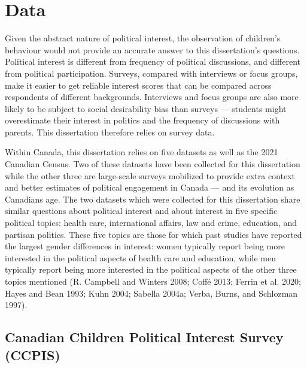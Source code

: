 \documentclass[
  letterpaper,
  DIV=11,
  numbers=noendperiod]{scrreprt}
\begin{document}
\hypertarget{data}{%
\section{Data}\label{data}}

Given the abstract nature of political interest, the observation of
children's behaviour would not provide an accurate answer to this
dissertation's questions. Political interest is different from frequency
of political discussions, and different from political participation.
Surveys, compared with interviews or focus groups, make it easier to get
reliable interest scores that can be compared across respondents of
different backgrounds. Interviews and focus groups are also more likely
to be subject to social desirability bias than surveys --- students
might overestimate their interest in politics and the frequency of
discussions with parents. This dissertation therefore relies on survey
data.

Within Canada, this dissertation relies on five datasets as well as the
2021 Canadian Census. Two of these datasets have been collected for this
dissertation while the other three are large-scale surveys mobilized to
provide extra context and better estimates of political engagement in
Canada --- and its evolution as Canadians age. The two datasets which
were collected for this dissertation share similar questions about
political interest and about interest in five specific political topics:
health care, international affairs, law and crime, education, and
partisan politics. These five topics are those for which past studies
have reported the largest gender differences in interest: women
typically report being more interested in the political aspects of
health care and education, while men typically report being more
interested in the political aspects of the other three topics mentioned
(R. Campbell and Winters 2008; Coffé 2013; Ferrin et al. 2020; Hayes and
Bean 1993; Kuhn 2004; Sabella 2004a; Verba, Burns, and Schlozman 1997).

\hypertarget{canadian-children-political-interest-survey-ccpis}{%
\subsection{Canadian Children Political Interest Survey
(CCPIS)}\label{canadian-children-political-interest-survey-ccpis}}
\end{document}
